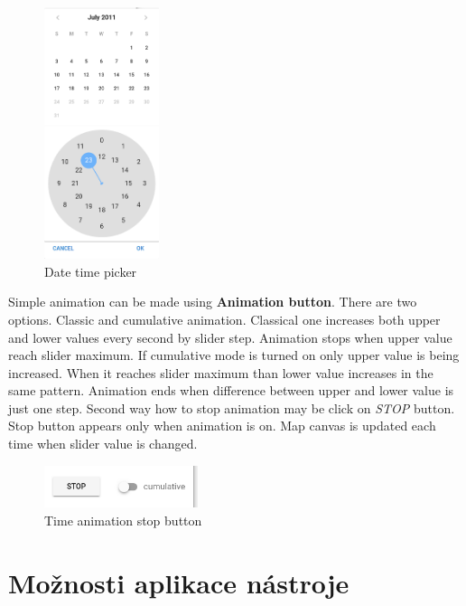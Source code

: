 \begin{figure}[h!]
	\centering
	\includegraphics[width=0.3\textwidth]{../img/date-time-picker.png}
	\caption{Date time picker}
	\label{fig:date-time-picker}
\end{figure}

Simple animation can be made using \textbf{Animation button}. There are two 
options. Classic and cumulative animation. Classical one increases both 
upper and lower values every second by slider step. 
Animation stops when upper value reach slider maximum. If cumulative 
mode is turned on only upper value is being increased. When it reaches 
slider maximum than lower value increases in the same pattern.
Animation ends when difference between upper and lower value is just one 
step. Second  way how to stop animation may be click on \textit{STOP} button. 
Stop button appears only when animation is on. Map canvas is updated 
each time when slider value is changed.

\begin{figure}[h!]
	\centering
	\includegraphics[width=0.4\textwidth]{../img/time-animation-stop.png}
	\caption{Time animation stop button}
	\label{fig:time-animation-stop}
\end{figure}

\newpage
\section{Možnosti aplikace nástroje}
\label{ssec:aplication}

